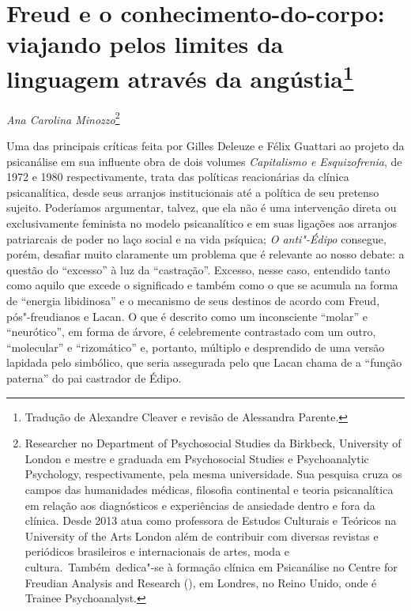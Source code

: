 \chapter*{Freud e o conhecimento-do-corpo: viajando pelos limites da
linguagem através da angústia\footnote{Tradução de Alexandre Cleaver e revisão
  de Alessandra Parente.}}

\begin{flushright}
\emph{Ana Carolina Minozzo}\footnote{ Researcher no Department of Psychosocial
Studies da Birkbeck, University of London e mestre e graduada em Psychosocial
Studies e Psychoanalytic Psychology, respectivamente, pela mesma
universidade. Sua pesquisa cruza os campos das humanidades médicas, filosofia
continental e teoria psicanalítica em relação aos diagnósticos e experiências de
ansiedade dentro e fora da clínica. Desde 2013 atua como professora de Estudos
Culturais e Teóricos na University of the Arts London além de contribuir com
diversas revistas e periódicos brasileiros e internacionais de artes, moda e
cultura. Também dedica"-se à formação clínica em Psicanálise no Centre for
Freudian Analysis and Research (), em Londres, no Reino Unido, onde é
Trainee Psychoanalyst.}
\end{flushright}

Uma das principais críticas feita por Gilles Deleuze e Félix Guattari ao
projeto da psicanálise em sua influente obra de dois volumes
\emph{Capitalismo e Esquizofrenia}, de 1972 e 1980 respectivamente,
trata das políticas reacionárias da clínica psicanalítica, desde seus
arranjos institucionais até a política de seu pretenso sujeito.
Poderíamos argumentar, talvez, que ela não é uma intervenção direta ou
exclusivamente feminista no modelo psicanalítico e em suas ligações aos
arranjos patriarcais de poder no laço social e na vida psíquica;
\emph{O anti"-Édipo} consegue, porém, desafiar muito claramente um
problema que é relevante ao nosso debate: a questão do ``excesso'' à luz
da ``castração''. Excesso, nesse caso, entendido tanto como aquilo que
excede o significado e também como o que se acumula na forma de
``energia libidinosa'' e o mecanismo de seus destinos de acordo com
Freud, pós"-freudianos e Lacan. O que é descrito como um inconsciente
``molar'' e ``neurótico'', em forma de árvore, é celebremente
contrastado com um outro, ``molecular'' e ``rizomático'' e, portanto,
múltiplo e desprendido de uma versão lapidada pelo simbólico, que seria
assegurada pelo que Lacan chama de a ``função paterna'' do pai castrador
de Édipo.

